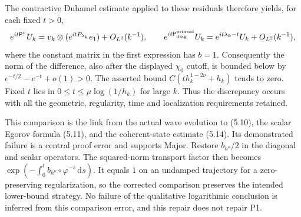 \documentclass[10pt]{article}
\begin{document}
The contractive Duhamel estimate applied to these residuals therefore yields, for each fixed \(t>0\), \[e^{it\mathsf P^\nu}U_k
   =v_k\otimes(e^{itP_{\lambda_k}}e_1)+O_{L^2}(k^{-1}),\qquad
 e^{it\mathsf P_{\rm diag}^{\rm printed}}U_k
   =e^{it\lambda_k-t}U_k+O_{L^2}(k^{-1}),\] where the constant matrix in the first expression has \(b=1\). Consequently the norm of the difference, also after the displayed \(\chi_0\) cutoff, is bounded below by \(e^{-t/2}-e^{-t}+o(1)>0\). The asserted bound \(C(th_k^{1-2\nu}+h_k)\) tends to zero. Fixed \(t\) lies in \(0\leq t\leq\mu\log(1/h_k)\) for large \(k\). Thus the discrepancy occurs with all the geometric, regularity, time and localization requirements retained.\par
This comparison is the link from the actual wave evolution to (5.10), the scalar Egorov formula (5.11), and the coherent-state estimate (5.14). Its demonstrated failure is a central proof error and supports Major. Restore \(b_{h^\nu}/2\) in the diagonal and scalar operators. The squared-norm transport factor then becomes \(\exp(-\int_0^t b_{h^\nu}\circ\varphi^{-s}\,\mathrm ds)\). It equals \(1\) on an undamped trajectory for a zero-preserving regularization, so the corrected comparison preserves the intended lower-bound strategy. No failure of the qualitative logarithmic conclusion is inferred from this comparison error, and this repair does not repair P1.\par
\end{document}

